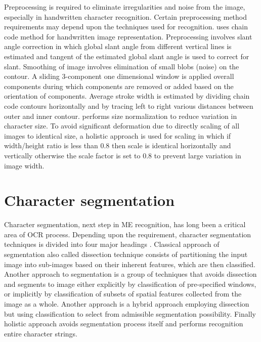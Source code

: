 Preprocessing is required to eliminate irregularities and noise from
the image, especially in handwritten character recognition. Certain
preprocessing method requirements may depend upon the techniques
used for recognition. \cite{gyeonghwan1997lda} uses chain code
method for handwritten image representation. Preprocessing involves
slant angle correction in which global slant angle from different
vertical lines is estimated and tangent of the estimated global
slant angle is used to correct for slant. Smoothing of image
involves elimination of small blobs (noise) on the contour. A
sliding 3-component one dimensional window is applied overall
components during which components are removed or added based on the
orientation of components. Average stroke width is estimated by
dividing chain code contours horizontally and by tracing left to
right various distances between outer and inner contour.
\cite{jcai1999issi} performs size normalization to reduce variation
in character size. To avoid significant deformation due to directly
scaling of all images to identical size, a holistic approach is used
for scaling in which if width/height ratio is less than 0.8 then
scale is identical horizontally and vertically otherwise the scale
factor is set to 0.8 to prevent large variation in image width.

\section{Character segmentation}
%

Character segmentation, next step in ME recognition, has long been a
critical area of OCR process. Depending upon the requirement,
character segmentation techniques is divided into four major
headings \cite{CaseyLecolinet1996}. Classical approach of
segmentation also called dissection technique consists of
partitioning the input image into sub-images based on their inherent
features, which are then classified. Another approach to
segmentation is a group of techniques that avoids dissection and
segments to image either explicitly by classification of
pre-specified windows, or implicitly by classification of subsets of
spatial features collected from the image as a whole. Another
approach is a hybrid approach employing dissection but using
classification to select from admissible segmentation possibility.
Finally holistic approach avoids segmentation process itself and
performs recognition entire character strings.

